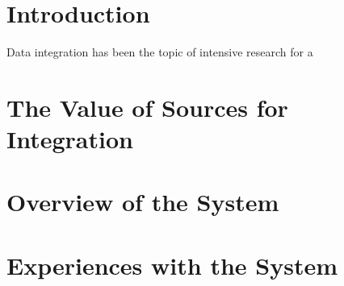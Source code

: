 \documentclass{vldb}
\begin{document}
\section{Introduction}
Data integration has been the topic of intensive research for a

\section{The Value of Sources for Integration}


\section{Overview of the System}


\section{Experiences with the System}



\end{document}
